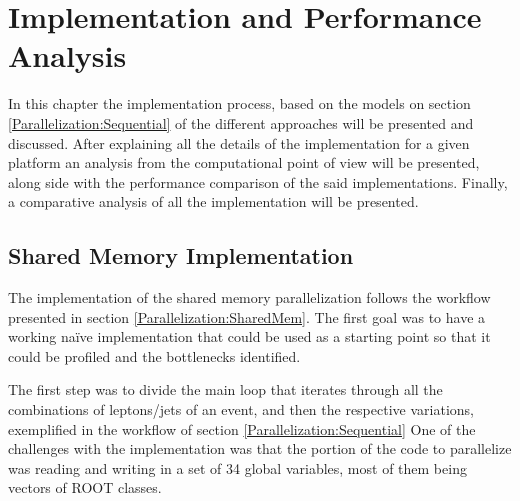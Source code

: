 \chapter{Implementation and Performance Analysis}
\label{Implementation}

In this chapter the implementation process, based on the models on section \ref{Parallelization:Sequential} of the different approaches will be presented and discussed. After explaining all the details of the implementation for a given platform an analysis from the computational point of view will be presented, along side with the performance comparison of the said implementations. Finally, a comparative analysis of all the implementation will be presented.

\section{Shared Memory Implementation}
\label{Implementation:SharedMem}

The implementation of the shared memory parallelization follows the workflow presented in section \ref{Parallelization:SharedMem}. The first goal was to have a working na\"{i}ve implementation that could be used as a starting point so that it could be profiled and the bottlenecks identified.

The first step was to divide the \ttDilepKinFit main loop that iterates through all the combinations of leptons/jets of an event, and then the respective variations, exemplified in the workflow of section \ref{Parallelization:Sequential}
One of the challenges with the implementation was that the portion of the code to parallelize was reading and writing in a set of 34 global variables, most of them being vectors of ROOT classes.